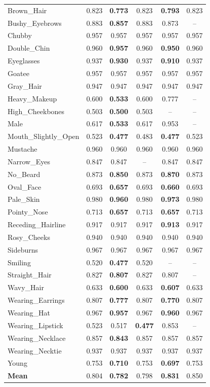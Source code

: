 \begin{table}[t]
\begin{tabular}{l c c c c c}
Brown\_Hair & 0.823 & \textbf{0.773} & 0.823 & \textbf{0.793} & 0.823 \\
Bushy\_Eyebrows & 0.883 & \textbf{0.857} & 0.883 & 0.873 & -- \\
Chubby & 0.957 & 0.957 & 0.957 & 0.957 & 0.957 \\
Double\_Chin & 0.960 & \textbf{0.957} & 0.960 & \textbf{0.950} & 0.960 \\
Eyeglasses & 0.937 & \textbf{0.930} & 0.937 & \textbf{0.910} & 0.937 \\
Goatee & 0.957 & 0.957 & 0.957 & 0.957 & 0.957 \\
Gray\_Hair & 0.947 & 0.947 & 0.947 & 0.947 & 0.947 \\
Heavy\_Makeup & 0.600 & \textbf{0.533} & 0.600 & 0.777 & -- \\
High\_Cheekbones & 0.503 & \textbf{0.500} & 0.503 & -- & -- \\
Male & 0.617 & \textbf{0.533} & 0.617 & 0.953 & -- \\
Mouth\_Slightly\_Open & 0.523 & \textbf{0.477} & 0.483 & \textbf{0.477} & 0.523 \\
Mustache & 0.960 & 0.960 & 0.960 & 0.960 & 0.960 \\
Narrow\_Eyes & 0.847 & 0.847 & -- & 0.847 & 0.847 \\
No\_Beard & 0.873 & \textbf{0.850} & 0.873 & \textbf{0.870} & 0.873 \\
Oval\_Face & 0.693 & \textbf{0.657} & 0.693 & \textbf{0.660} & 0.693 \\
Pale\_Skin & 0.980 & \textbf{0.960} & 0.980 & \textbf{0.973} & 0.980 \\
Pointy\_Nose & 0.713 & \textbf{0.657} & 0.713 & \textbf{0.657} & 0.713 \\
Receding\_Hairline & 0.917 & 0.917 & 0.917 & \textbf{0.913} & 0.917 \\
Rosy\_Cheeks & 0.940 & 0.940 & 0.940 & 0.940 & 0.940 \\
Sideburns & 0.967 & 0.967 & 0.967 & 0.967 & 0.967 \\
Smiling & 0.520 & \textbf{0.477} & 0.520 & -- & -- \\
Straight\_Hair & 0.827 & \textbf{0.807} & 0.827 & 0.807 & -- \\
Wavy\_Hair & 0.633 & \textbf{0.600} & 0.633 & \textbf{0.607} & 0.633 \\
Wearing\_Earrings & 0.807 & \textbf{0.777} & 0.807 & \textbf{0.770} & 0.807 \\
Wearing\_Hat & 0.967 & \textbf{0.957} & 0.967 & \textbf{0.960} & 0.967 \\
Wearing\_Lipstick & 0.523 & 0.517 & \textbf{0.477} & 0.853 & -- \\
Wearing\_Necklace & 0.857 & \textbf{0.843} & 0.857 & 0.857 & 0.857 \\
Wearing\_Necktie & 0.937 & 0.937 & 0.937 & 0.937 & 0.937 \\
Young & 0.753 & \textbf{0.710} & 0.753 & \textbf{0.697} & 0.753 \\
\midrule
\textbf{Mean} & 0.804 & \textbf{0.782} & 0.798 & \textbf{0.831} & 0.850 \\
\bottomrule
\end{tabular}
\end{table}
